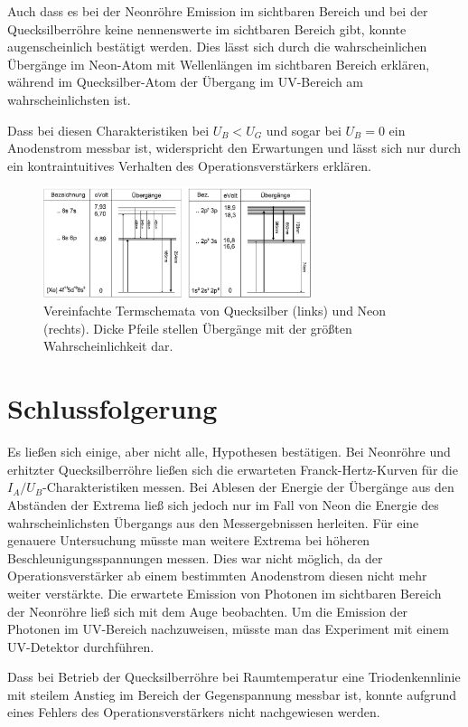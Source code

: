 \documentclass[
	a4paper,
	12pt,
	pagesize,
	ngerman
]{scrartcl}
\begin{document}
	Auch dass es bei der Neonröhre Emission im sichtbaren Bereich und bei der Quecksilberröhre keine nennenswerte im sichtbaren Bereich gibt, konnte augenscheinlich bestätigt werden.
	Dies lässt sich durch die wahrscheinlichen Übergänge im Neon-Atom mit Wellenlängen im sichtbaren Bereich erklären, während im Quecksilber-Atom der Übergang im UV-Bereich am wahrscheinlichsten ist.
	
	Dass bei diesen Charakteristiken bei $U_B < U_G$ und sogar bei $U_B=0$ ein Anodenstrom messbar ist, widerspricht den Erwartungen und lässt sich nur durch ein kontraintuitives Verhalten des Operationsverstärkers erklären.
	
	\begin{figure}[H]
		\includegraphics[width=0.7\textwidth]{Term}
		\centering
		\caption{Vereinfachte Termschemata von Quecksilber (links) und Neon
			(rechts). Dicke Pfeile stellen Übergänge mit der größten Wahrscheinlichkeit
			dar.\cite{Roehren} }
		\label{Term}
		\centering
	\end{figure}
	
	
	\section{Schlussfolgerung}
	Es ließen sich einige, aber nicht alle, Hypothesen bestätigen.
	Bei Neonröhre und erhitzter Quecksilberröhre ließen sich die erwarteten Franck-Hertz-Kurven für die $I_A/U_B$-Charakteristiken messen.
	Bei Ablesen der Energie der Übergänge aus den Abständen der Extrema ließ sich jedoch nur im Fall von Neon die Energie des wahrscheinlichsten Übergangs aus den Messergebnissen herleiten.
	Für eine genauere Untersuchung müsste man weitere Extrema bei höheren Beschleunigungsspannungen messen.
	Dies war nicht möglich, da der Operationsverstärker ab einem bestimmten Anodenstrom diesen nicht mehr weiter verstärkte.
	Die erwartete Emission von Photonen im sichtbaren Bereich der Neonröhre ließ sich mit dem Auge beobachten.
	Um die Emission der Photonen im UV-Bereich nachzuweisen, müsste man das Experiment mit einem UV-Detektor durchführen.
	
	Dass bei Betrieb der Quecksilberröhre bei Raumtemperatur eine Triodenkennlinie mit steilem Anstieg im Bereich der Gegenspannung messbar ist, konnte aufgrund eines Fehlers des Operationsverstärkers nicht nachgewiesen werden.
	
	
	\printbibliography
\end{document}
